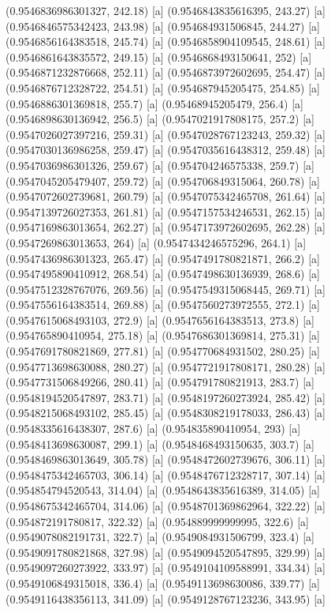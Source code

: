 {{{(0.9546836986301327, 242.18) [a] 
(0.9546843835616395, 243.27) [a] 
(0.9546846575342423, 243.98) [a] 
(0.954684931506845, 244.27) [a] 
(0.9546856164383518, 245.74) [a] 
(0.9546858904109545, 248.61) [a] 
(0.9546861643835572, 249.15) [a] 
(0.9546868493150641, 252) [a] 
(0.9546871232876668, 252.11) [a] 
(0.9546873972602695, 254.47) [a] 
(0.9546876712328722, 254.51) [a] 
(0.954687945205475, 254.85) [a] 
(0.9546886301369818, 255.7) [a] 
(0.95468945205479, 256.4) [a] 
(0.9546898630136942, 256.5) [a] 
(0.9547021917808175, 257.2) [a] 
(0.9547026027397216, 259.31) [a] 
(0.9547028767123243, 259.32) [a] 
(0.9547030136986258, 259.47) [a] 
(0.9547035616438312, 259.48) [a] 
(0.9547036986301326, 259.67) [a] 
(0.954704246575338, 259.7) [a] 
(0.9547045205479407, 259.72) [a] 
(0.954706849315064, 260.78) [a] 
(0.9547072602739681, 260.79) [a] 
(0.9547075342465708, 261.64) [a] 
(0.9547139726027353, 261.81) [a] 
(0.9547157534246531, 262.15) [a] 
(0.9547169863013654, 262.27) [a] 
(0.9547173972602695, 262.28) [a] 
(0.9547269863013653, 264) [a] 
(0.9547434246575296, 264.1) [a] 
(0.9547436986301323, 265.47) [a] 
(0.9547491780821871, 266.2) [a] 
(0.9547495890410912, 268.54) [a] 
(0.9547498630136939, 268.6) [a] 
(0.9547512328767076, 269.56) [a] 
(0.9547549315068445, 269.71) [a] 
(0.9547556164383514, 269.88) [a] 
(0.9547560273972555, 272.1) [a] 
(0.9547615068493103, 272.9) [a] 
(0.9547656164383513, 273.8) [a] 
(0.954765890410954, 275.18) [a] 
(0.9547686301369814, 275.31) [a] 
(0.9547691780821869, 277.81) [a] 
(0.954770684931502, 280.25) [a] 
(0.9547713698630088, 280.27) [a] 
(0.9547721917808171, 280.28) [a] 
(0.9547731506849266, 280.41) [a] 
(0.954791780821913, 283.7) [a] 
(0.9548194520547897, 283.71) [a] 
(0.9548197260273924, 285.42) [a] 
(0.9548215068493102, 285.45) [a] 
(0.9548308219178033, 286.43) [a] 
(0.9548335616438307, 287.6) [a] 
(0.954835890410954, 293) [a] 
(0.9548413698630087, 299.1) [a] 
(0.9548468493150635, 303.7) [a] 
(0.9548469863013649, 305.78) [a] 
(0.9548472602739676, 306.11) [a] 
(0.9548475342465703, 306.14) [a] 
(0.9548476712328717, 307.14) [a] 
(0.954854794520543, 314.04) [a] 
(0.9548643835616389, 314.05) [a] 
(0.9548675342465704, 314.06) [a] 
(0.9548701369862964, 322.22) [a] 
(0.954872191780817, 322.32) [a] 
(0.954889999999995, 322.6) [a] 
(0.9549078082191731, 322.7) [a] 
(0.9549084931506799, 323.4) [a] 
(0.9549091780821868, 327.98) [a] 
(0.9549094520547895, 329.99) [a] 
(0.9549097260273922, 333.97) [a] 
(0.9549104109588991, 334.34) [a] 
(0.9549106849315018, 336.4) [a] 
(0.9549113698630086, 339.77) [a] 
(0.9549116438356113, 341.09) [a] 
(0.9549128767123236, 343.95) [a] 
}}}
